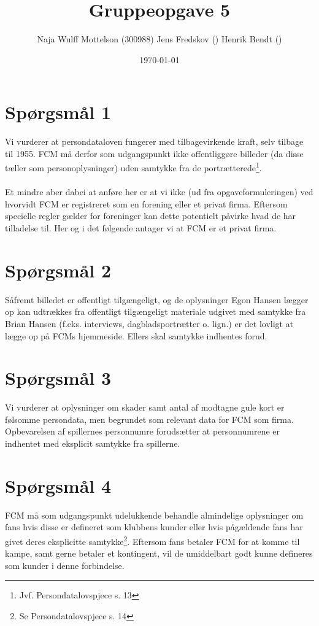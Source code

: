 \documentclass[10pt,a4paper]{article}
\title{Gruppeopgave 5}
\author{Naja Wulff Mottelson (300988)
        Jens Fredskov () 
        Henrik Bendt ()}
\date{\today}
\begin{document}
\maketitle

\section{Spørgsmål 1}
Vi vurderer at persondataloven fungerer med tilbagevirkende kraft, 
selv tilbage til 1955. FCM må derfor som udgangspunkt ikke 
offentliggøre billeder (da disse tæller som personoplysninger) uden
samtykke fra de portrætterede\footnote{Jvf. Persondatalovspjece s. 13}.

\paragraph{}
Et mindre aber dabei at anføre her er at vi ikke (ud fra opgaveformuleringen)
ved hvorvidt FCM er 
registreret som en forening eller et privat firma. Eftersom specielle 
regler gælder for foreninger kan dette potentielt påvirke hvad 
de har tilladelse til. Her og i det følgende antager vi at FCM
er et privat firma. 

\section{Spørgsmål 2}
Såfremt billedet er offentligt tilgængeligt, og de oplysninger 
Egon Hansen lægger op kan udtrækkes fra offentligt tilgængeligt
materiale udgivet med samtykke fra Brian Hansen (f.eks. interviews, 
dagbladsportrætter o. lign.) er det lovligt at lægge op på
FCMs hjemmeside. Ellers skal samtykke indhentes forud. 

\section{Spørgsmål 3}
Vi vurderer at oplysninger om skader samt antal af modtagne gule 
kort er følsomme persondata, men begrundet som relevant data for
FCM som firma. Opbevarelsen af spillernes personnumre forudsætter
at personnumrene er indhentet med eksplicit samtykke fra spillerne. 

\section{Spørgsmål 4}
FCM må som udgangspunkt udelukkende behandle almindelige oplysninger 
om fans hvis disse er 
defineret som klubbens kunder eller hvis pågældende fans har givet
deres eksplicitte samtykke\footnote{Se Persondatalovspjece s. 14}.
 Eftersom fans betaler FCM for at komme til 
kampe, samt gerne betaler et kontingent, vil de umiddelbart godt 
kunne defineres som kunder i denne forbindelse. 
\end{document}
